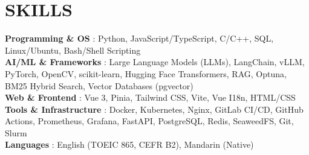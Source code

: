 \documentclass[letterpaper,11pt]{article}
\let\oldsection\section
\renewcommand{\section}[1]{\needspace{3\baselineskip}\oldsection{#1}}
\begin{document}
\section{SKILLS}
 \begin{itemize}[leftmargin=0in, label={}]
    \small{\item{
     \textbf{Programming \& OS} {: Python, JavaScript/TypeScript, C/C++, SQL, Linux/Ubuntu, Bash/Shell Scripting}\vspace{2pt} \\
     \textbf{AI/ML \& Frameworks}  {: Large Language Models (LLMs), LangChain, vLLM, PyTorch, OpenCV, scikit-learn, Hugging Face Transformers, RAG, Optuna, BM25 Hybrid Search, Vector Databases (pgvector)}\vspace{2pt} \\
     \textbf{Web \& Frontend}       {: Vue 3, Pinia, Tailwind CSS, Vite, Vue I18n, HTML/CSS}\vspace{2pt} \\
     \textbf{Tools \& Infrastructure} {: Docker, Kubernetes, Nginx, GitLab CI/CD, GitHub Actions, Prometheus, Grafana, FastAPI, PostgreSQL, Redis, SeaweedFS, Git, Slurm}\vspace{2pt} \\
     \textbf{Languages}             {: English (TOEIC 865, CEFR B2), Mandarin (Native)}
    }}
 \end{itemize}

\end{document}
